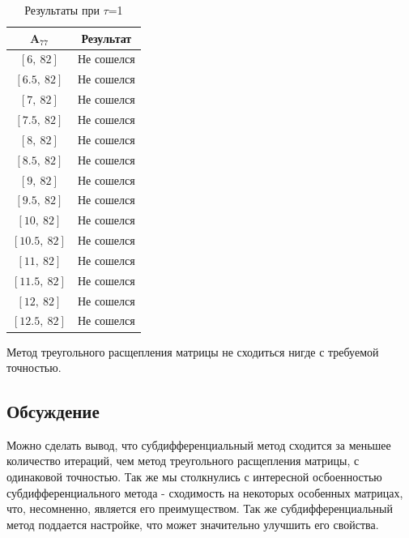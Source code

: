 \documentclass{article}
\begin{document}
    \begin{table}[H]
			\centering
			\begin{tabular}{|c|c|}
				\hline
				$\textbf{A}_{77}$ & Результат\\
				
				\hline
				$[6, \ 82]$ & Не сошелся \\
				
				\hline
				$[6.5, \ 82]$ & Не сошелся \\
				
				\hline
				$[7, \ 82]$ & Не сошелся \\
				
				\hline
				$[7.5, \ 82]$ & Не сошелся \\
				
				\hline
				$[8, \ 82]$ & Не сошелся \\
				
				\hline
				$[8.5, \ 82]$ & Не сошелся \\
				
				\hline
				$[9, \ 82]$ & Не сошелся \\
				
				\hline
				$[9.5, \ 82]$ & Не сошелся \\
				
				\hline
				$[10, \ 82]$ & Не сошелся \\
				
				\hline
				$[10.5, \ 82]$ & Не сошелся \\
				
				\hline
				$[11, \ 82]$ & Не сошелся \\
				
				\hline
				$[11.5, \ 82]$ & Не сошелся \\
				
				\hline
				$[12, \ 82]$ & Не сошелся \\
				
				\hline
				$[12.5, \ 82]$ & Не сошелся \\

				\hline
				
			\end{tabular}
			\caption{Результаты при $\tau$=1}
		\end{table}
	    
	    Метод треугольного расщепления матрицы не сходиться нигде с требуемой точностью.
	    
    \subsection{Обсуждение}
    Можно сделать вывод, что субдифференциальный метод сходится за меньшее количество итераций, чем метод треугольного расщепления матрицы, с одинаковой точностью. Так же мы столкнулись с интересной осбоенностью субдифференциального метода - сходимость на некоторых особенных матрицах, что, несомненно, является его преимуществом. Так же субдифференциальный метод поддается настройке, что может значительно улучшить его свойства.
    
\end{document}
